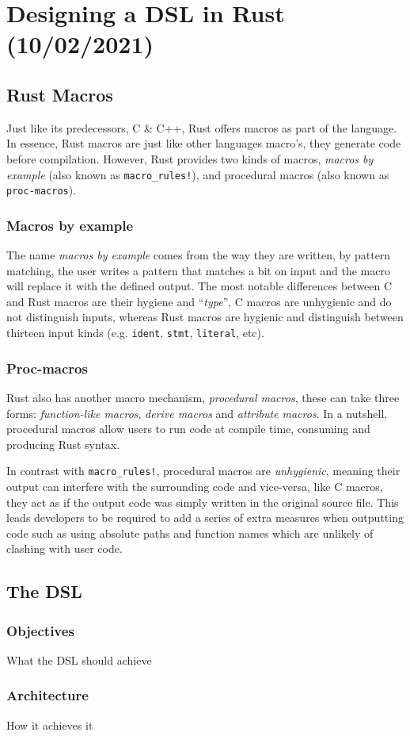 \chapter{Designing a DSL in Rust (10/02/2021)}\label{cha:rust-dsl}

\section{Rust Macros}

Just like its predecessors, C \& C++, Rust offers macros as part of the language.
In essence, Rust macros are just like other languages macro's, they generate code before compilation.
However, Rust provides two kinds of macros, \emph{macros by example} (also known as \texttt{macro\_rules!}),
and procedural macros (also known as \texttt{proc-macros}).

\subsection{Macros by example}

The name \emph{macros by example} comes from the way they are written, by pattern matching,
the user writes a pattern that matches a bit on input and the macro will replace it with the defined output.
The most notable differences between C and Rust macros are their hygiene and “\emph{type}”,
C macros are unhygienic and do not distinguish inputs, whereas Rust macros are hygienic
and distinguish between thirteen input kinds (e.g. \texttt{ident}, \texttt{stmt}, \texttt{literal}, etc).


\subsection{Proc-macros}

Rust also has another macro mechanism, \emph{procedural macros},
these can take three forms: \emph{function-like macros}, \emph{derive macros} and \emph{attribute macros}.
In a nutshell, procedural macros allow users to run code at compile time, consuming and producing Rust syntax.

In contrast with \texttt{macro\_rules!}, procedural macros are \emph{unhygienic},
meaning their output can interfere with the surrounding code and vice-versa,
like C macros, they act as if the output code was simply written in the original source file.
This leads developers to be required to add a series of extra measures when outputting code
such as using absolute paths and function names which are unlikely of clashing with user code.



\section{The DSL}
\subsection{Objectives}
What the DSL should achieve
\subsection{Architecture}
How it achieves it